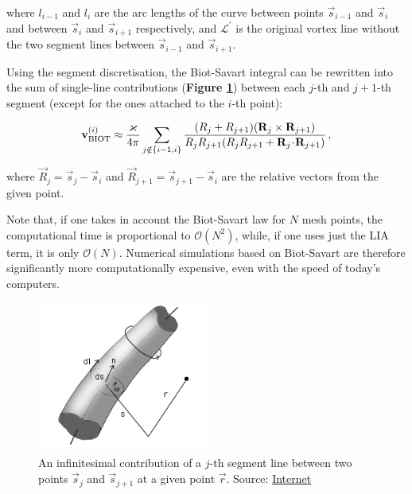 where $l_{i-1}$ and $l_i$ are the arc lengths of the curve between
points $\vec{s}_{i-1}$ and $\vec{s}_i$ and between $\vec{s}_i$ and $\vec{s}_{i+1}$ respectively, and $\mathcal{L}^{\prime}$ is the original vortex line without the two segment lines between $\vec{s}_{i-1}$ and $\vec{s}_{i+1}$.

Using the segment discretisation, the Biot-Savart integral can be rewritten \cite{samuels} into the sum of single-line contributions (\textbf{Figure \ref{element}}) between each $j$-th and $j+1$-th segment (except for the ones attached to the $i$-th point):

\begin{equation}
\mathbf{v}_{\text{BIOT}}^{(i)} \approx
\frac{\varkappa}{4\pi}
\sum_{j \notin \{i-1, i\}}
\frac{(R_j + R_{j+1}) (\mathbf{R}_j \times \mathbf{R}_{j+1})}{R_j R_{j+1} (R_j R_{j+1} + \mathbf{R}_j \!\cdot\! \mathbf{R}_{j+1})}\,,
\end{equation}

where $\vec{R}_j = \vec{s}_j - \vec{s}_i$ and $\vec{R}_{j+1} = \vec{s}_{j+1} - \vec{s}_i$ are the relative vectors from the given point.

Note that, if one takes in account the Biot-Savart law for $N$ mesh points, the computational time is proportional to $\mathcal{O}(N^2)$, while, if one uses just the LIA term, it is only $\mathcal{O}(N)$. Numerical simulations based on Biot-Savart are therefore significantly more computationally expensive, even with the speed of today's computers.

\begin{figure}[h]
	\centering
	\includegraphics[width=0.5\textwidth]{graphics/simul/biot}
	\caption{An infinitesimal contribution of a $j$-th segment line between two points $\vec{s}_j$ and $\vec{s}_{j+1}$ at a given point $\vec{r}$. Source: \href{http://docs.desktop.aero/appliedaero/potential3d/BiotSavart.html}{Internet}}
	\label{element}
\end{figure}

